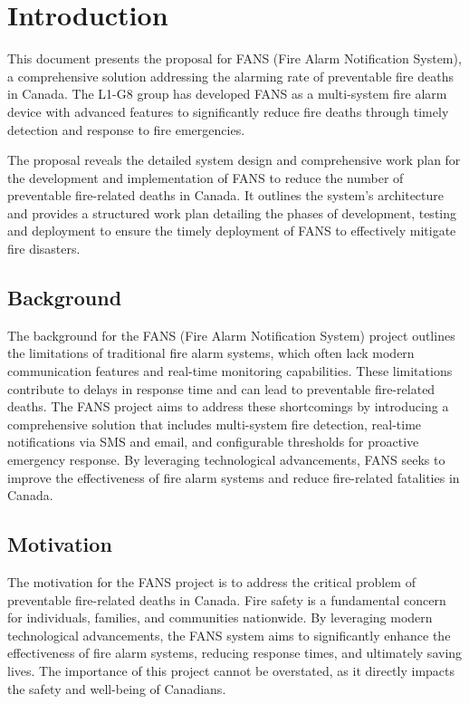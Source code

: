 \section{Introduction}

This document presents the proposal for FANS (Fire Alarm Notification System), a comprehensive solution addressing the
alarming rate of preventable fire deaths in Canada. The L1-G8 group has developed FANS as a multi-system fire alarm
device with advanced features to significantly reduce fire deaths through timely detection and response to fire
emergencies.

The proposal reveals the detailed system design and comprehensive work plan for the development and implementation of
FANS to reduce the number of preventable fire-related deaths in Canada. It outlines the system’s architecture and
provides a structured work plan detailing the phases of development, testing and deployment to ensure the timely
deployment of FANS to effectively mitigate fire disasters.

\subsection{Background}

The background for the FANS (Fire Alarm Notification System) project outlines the limitations of traditional fire alarm
systems, which often lack modern communication features and real-time monitoring capabilities. These limitations
contribute to delays in response time and can lead to preventable fire-related deaths. The FANS project aims to address
these shortcomings by introducing a comprehensive solution that includes multi-system fire detection, real-time
notifications via SMS and email, and configurable thresholds for proactive emergency response. By leveraging
technological advancements, FANS seeks to improve the effectiveness of fire alarm systems and reduce fire-related
fatalities in Canada.

\subsection{Motivation}

The motivation for the FANS project is to address the critical problem of preventable fire-related deaths in Canada.
Fire safety is a fundamental concern for individuals, families, and communities nationwide. By leveraging modern
technological advancements, the FANS system aims to significantly enhance the effectiveness of fire alarm systems,
reducing response times, and ultimately saving lives. The importance of this project cannot be overstated, as it
directly impacts the safety and well-being of Canadians.

